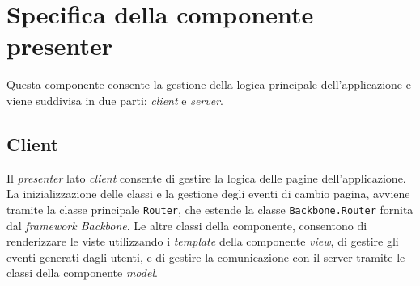 \section{Specifica della componente presenter}
Questa componente consente la gestione della logica principale dell'applicazione \progetto{} e viene suddivisa in due parti: \textit{client} e \textit{server}.

\subsection{Client}

Il \textit{presenter} lato \textit{client} consente di gestire la logica delle pagine dell'applicazione.
La inizializzazione delle classi e la gestione degli eventi di cambio pagina, avviene tramite la classe principale \texttt{Router}, che estende la classe \texttt{Backbone.Router} fornita dal \textit{framework Backbone}.
Le altre classi della componente, consentono di renderizzare le viste utilizzando i \textit{template} della componente \textit{view}, di gestire gli eventi generati dagli utenti, e di gestire la comunicazione con il server tramite le classi della componente \textit{model}.

